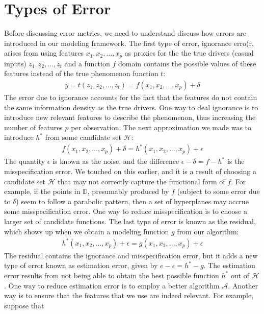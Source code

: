 \documentclass[12pt]{article}
\begin{document}
	\section{Types of Error}
	Before discussing error metrics, we need to understand discuss how errors
	are introduced in our modeling framework. The first type of error, ignorance
	erro(r, arises from using features $x_1,x_2,\ldots,x_p$ as proxies for
	the the true drivers (casual inputs) $z_1,z_2,\ldots,z_t$ and a function
	$f$ domain contains the possible values of these features instead of
	the true phenomenon function $t$:
	\begin{align*}
		y = t(z_1,z_2,\ldots,z_t)=f(x_1,x_2,\ldots,x_p) +\delta
	\end{align*}
	The error due to ignorance accounts for the fact that the features do not
	contain the same information density as the true drivers. One way to
	deal ignorance is to introduce new relevant features to describe the
	phenomenon, thus increasing the number of features $p$ per observation.
	The next approximation we made was to introduce $h^*$ from some candidate
	set $\mathcal{H}$:
	\begin{align*}
		f(x_1,x_2,\ldots,x_p) + \delta = h^*(x_1,x_2,\ldots,x_p) + \epsilon
	\end{align*}
	The quantity $\epsilon$ is known as the noise, and the difference
	$\epsilon-\delta=f-h^*$ is the misspecification error. We touched on this
	earlier, and it is a result of choosing a candidate set $\mathcal{H}$ that
	may not correctly capture the functional form of $f$. For example, if the
	points in $\mathbb{D}$, presumably produced by $f$ (subject to some error
	due to $\delta$) seem to follow a parabolic pattern, then a set of
	hyperplanes may accrue some misspecification error. One way to reduce
	misspecification is to choose a larger set of candidate functions.
	The last type of error is known as the residual, which shows up when
	we obtain a modeling function $g$ from our algorithm:
	\begin{align*}
		h^*(x_1,x_2,\ldots,x_p) + \epsilon = g(x_1,x_2,\ldots,x_p) + \epsilon
	\end{align*}
	The residual contains the ignorance and misspecification error, but it
	adds a new type of error known as estimation error, given by $e-\epsilon = h^*-g$.
	The estimation error results from not being able to obtain the best possible
	function $h^*$ out of $\mathcal{H}$. One way to reduce estimation error is to
	employ a better algorithm $\mathcal{A}$. Another way is to ensure that
	the features that we use are indeed relevant. For example, suppose that
\end{document}
